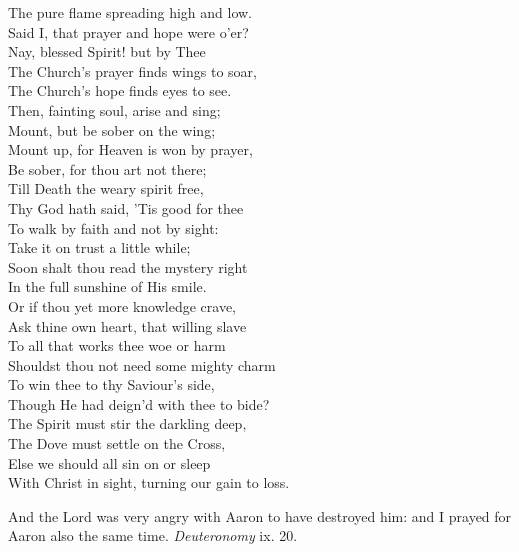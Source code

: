  The pure flame spreading high and low. \\
 Said I, that prayer and hope were o’er? \\
 Nay, blessed Spirit! but by Thee \\
 The Church’s prayer finds wings to soar, \\
 The Church’s hope finds eyes to see. \\
  Then, fainting soul, arise and sing; \\
 Mount, but be sober on the wing; \\
 Mount up, for Heaven is won by prayer, \\
 Be sober, for thou art not there; \\
 Till Death the weary spirit free, \\
 Thy God hath said, ’Tis good for thee \\
 To walk by faith and not by sight: \\
 Take it on trust a little while; \\
 Soon shalt thou read the mystery right \\
 In the full sunshine of His smile. \\
  Or if thou yet more knowledge crave, \\
 Ask thine own heart, that willing slave \\
 To all that works thee woe or harm \\
 Shouldst thou not need some mighty charm \\
 To win thee to thy Saviour’s side, \\
 Though He had deign’d with thee to bide? \\
 The Spirit must stir the darkling deep, \\
 The Dove must settle on the Cross, \\
 Else we should all sin on or sleep \\
 With Christ in sight, turning our gain to loss.\\


And the Lord was very angry with Aaron to have destroyed him: and I prayed for Aaron also the same time. \emph{Deuteronomy} ix. 20.

